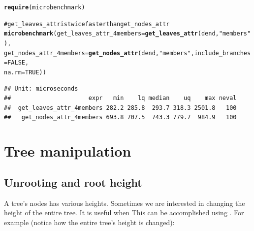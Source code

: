 \documentclass[shortnames,nojss,article]{jss}\usepackage{graphicx, color}
\makeatletter
\newcommand{\hlfunctioncall}[1]{\textcolor[rgb]{0.501960784313725,0,0.329411764705882}{\textbf{#1}}}%
\newcommand{\hlstring}[1]{\textcolor[rgb]{0.6,0.6,1}{#1}}%
\newcommand{\hlcomment}[1]{\textcolor[rgb]{0.180392156862745,0.6,0.341176470588235}{#1}}%
\newenvironment{kframe}{%
 \def\at@end@of@kframe{}%
 \ifinner\ifhmode%
  \def\at@end@of@kframe{\end{minipage}}%
  \begin{minipage}{\columnwidth}%
 \fi\fi%
 \def\FrameCommand##1{\hskip\@totalleftmargin \hskip-\fboxsep
 \colorbox{shadecolor}{##1}\hskip-\fboxsep
     \hskip-\linewidth \hskip-\@totalleftmargin \hskip\columnwidth}%
 \MakeFramed {\advance\hsize-\width
   \@totalleftmargin\z@ \linewidth\hsize
   \@setminipage}}%
 {\par\unskip\endMakeFramed%
 \at@end@of@kframe}
\newenvironment{knitrout}{}{} %
\makeatother
\begin{document}
\begin{knitrout}
\color{fgcolor}\begin{kframe}
\begin{alltt}

\hlfunctioncall{require}(microbenchmark)
\end{alltt}


{\ttfamily\noindent\itshape\color{messagecolor}{\#\# Loading required package: microbenchmark}}\begin{alltt}
\hlcomment{# get_leaves_attr is twice faster than get_nodes_attr}
\hlfunctioncall{microbenchmark}(get_leaves_attr_4members = \hlfunctioncall{get_leaves_attr}(dend, \hlstring{"members"}), 
    get_nodes_attr_4members = \hlfunctioncall{get_nodes_attr}(dend, \hlstring{"members"}, include_branches = FALSE, 
        na.rm = TRUE))
\end{alltt}
\begin{verbatim}
## Unit: microseconds
##                      expr   min    lq median    uq    max neval
##  get_leaves_attr_4members 282.2 285.8  293.7 318.3 2501.8   100
##   get_nodes_attr_4members 693.8 707.5  743.3 779.7  984.9   100
\end{verbatim}
\begin{alltt}


\end{alltt}
\end{kframe}
\end{knitrout}







\section{Tree manipulation}

\subsection{Unrooting and root height}

A tree's nodes has various heights. Sometimes we are interested in changing the height of the entire tree. It is useful when This can be accomplished using . For example (notice how the entire tree's height is changed):
\end{document}
